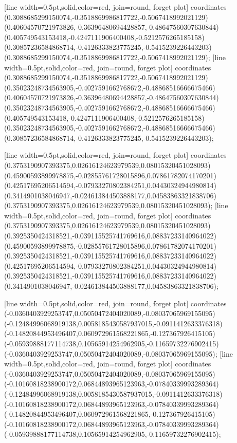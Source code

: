 [line width=0.5pt,solid,color=red, join=round, forget plot] coordinates {(0.3088685299150074,-0.3518869986817722,-0.5067418992021129) (0.40604570721973826,-0.36396480694428857,-0.48647560307630844) (0.405749543153418,-0.4247111906400408,-0.5212576265185158) (0.30857236584868714,-0.4126333823775245,-0.5415239226443203) (0.3088685299150074,-0.3518869986817722,-0.5067418992021129)};
[line width=0.5pt,solid,color=red, join=round, forget plot] coordinates {(0.3088685299150074,-0.3518869986817722,-0.5067418992021129) (0.35023248734563905,-0.4027591662768672,-0.48868516666675466) (0.40604570721973826,-0.36396480694428857,-0.48647560307630844) (0.35023248734563905,-0.4027591662768672,-0.48868516666675466) (0.405749543153418,-0.4247111906400408,-0.5212576265185158) (0.35023248734563905,-0.4027591662768672,-0.48868516666675466) (0.30857236584868714,-0.4126333823775245,-0.5415239226443203)};

[line width=0.5pt,solid,color=red, join=round, forget plot] coordinates {(0.3753190907393375,0.02616124623979539,0.08015320451028093) (0.45900593899978875,-0.02855761728015896,0.07861782074170201) (0.42517695206514594,-0.07933270802384251,0.04430324944980814) (0.3414901038046947,-0.024613844503888177,0.04583863321838706) (0.3753190907393375,0.02616124623979539,0.08015320451028093)};
[line width=0.5pt,solid,color=red, join=round, forget plot] coordinates {(0.3753190907393375,0.02616124623979539,0.08015320451028093) (0.3925350424318521,-0.039115525741769616,0.08837233140964022) (0.45900593899978875,-0.02855761728015896,0.07861782074170201) (0.3925350424318521,-0.039115525741769616,0.08837233140964022) (0.42517695206514594,-0.07933270802384251,0.04430324944980814) (0.3925350424318521,-0.039115525741769616,0.08837233140964022) (0.3414901038046947,-0.024613844503888177,0.04583863321838706)};

[line width=0.5pt,solid,color=red, join=round, forget plot] coordinates {(-0.0360403929253747,0.05050472404020089,-0.08037065969155095) (-0.12484996068919138,0.0058185430587937015,-0.0911412633376318) (-0.14820844953496407,0.060972961568221865,-0.127367926415105) (-0.05939888177114738,0.10565914254962905,-0.11659732276902415) (-0.0360403929253747,0.05050472404020089,-0.08037065969155095)};
[line width=0.5pt,solid,color=red, join=round, forget plot] coordinates {(-0.0360403929253747,0.05050472404020089,-0.08037065969155095) (-0.10160818238900172,0.06844893965123963,-0.07840339993289364) (-0.12484996068919138,0.0058185430587937015,-0.0911412633376318) (-0.10160818238900172,0.06844893965123963,-0.07840339993289364) (-0.14820844953496407,0.060972961568221865,-0.127367926415105) (-0.10160818238900172,0.06844893965123963,-0.07840339993289364) (-0.05939888177114738,0.10565914254962905,-0.11659732276902415)};

